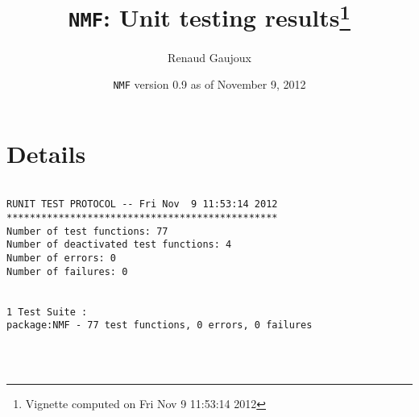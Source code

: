 \documentclass[10pt]{article}
\author{Renaud Gaujoux}
\title{\texttt{NMF}: Unit testing results\footnote{Vignette computed  on Fri Nov  9 11:53:14 2012}}
\date{\texttt{NMF} version 0.9 as of November  9, 2012}
\begin{document}
\maketitle

\section{Details}
\begin{verbatim}

RUNIT TEST PROTOCOL -- Fri Nov  9 11:53:14 2012 
*********************************************** 
Number of test functions: 77 
Number of deactivated test functions: 4 
Number of errors: 0 
Number of failures: 0 

 
1 Test Suite : 
package:NMF - 77 test functions, 0 errors, 0 failures




\end{verbatim}
\end{document}
